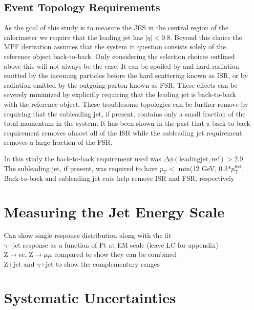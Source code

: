 \subsection{Event Topology Requirements}
As the goal of this study is to measure the \gls{JES} in the central region of the calorimeter we require that the leading jet has $\mid\eta\mid<$0.8.  
Beyond this choice the MPF derivation assumes that the system in question consists solely of the reference object back-to-back.  
Only considering the selection choices outlined above this will not always be the case.  
It can be spoiled by and hard radiation emitted by the incoming particles before the hard scattering known as \gls{ISR}, or by radiation emitted by the outgoing parton known as \gls{FSR}.  
These effects can be severely minimized by explicitly requiring that the leading jet is back-to-back with the reference object.  
These troublesome topologies can be further remove by requiring that the subleading jet, if present, contains only a small fraction of the total momentum in the system.  
It has been shown in the past that a back-to-back requirement removes almost all of the \gls{ISR} while the subleading jet requirement removes a large fraction of the \gls{FSR}.  

In this study the back-to-back requirement used was $\Delta \phi \left({\mathrm {leading jet, ref}}\right)>$2.9.  
The subleading jet, if present, was required to have $p_{\mathrm T}<$ min(12 GeV, 0.3*$p_{\mathrm T}^{\mathrm {Ref}}$.  
Back-to-back and subleading jet cuts help remove ISR and FSR, respectively 


\section{Measuring the Jet Energy Scale}
\label{MeasureJES}

Can show single response distribution along with the fit \\
$\gamma$+jet response as a function of Pt at EM scale (leave LC for appendix) \\
Z$\rightarrow$ee, Z$\rightarrow\mu\mu$ compared to show they can be combined \\
Z+jet and $\gamma$+jet to show the complementary ranges \\

\section{Systematic Uncertainties}

